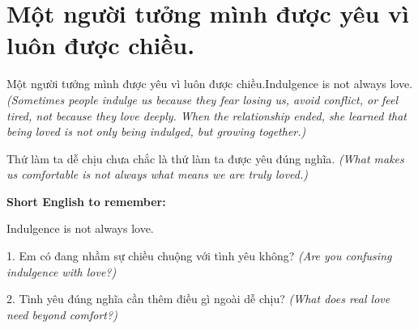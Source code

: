 \section{Một người tưởng mình được yêu vì luôn được chiều.}
\begin{truyen}{Một người tưởng mình được yêu vì luôn được chiều.}{Indulgence is not always love.}
\textit{(Sometimes people indulge us because they fear losing us, avoid conflict, or feel tired, not because they love deeply. When the relationship ended, she learned that being loved is not only being indulged, but growing together.)}
\end{truyen}
\begin{baihoc}
Thứ làm ta dễ chịu chưa chắc là thứ làm ta được yêu đúng nghĩa.
\textit{(What makes us comfortable is not always what means we are truly loved.)}
\end{baihoc}
\begin{ghinhoanh}
\textbf{Short English to remember:}

Indulgence is not always love.
\end{ghinhoanh}
\begin{tuhocnhanh}
1. Em có đang nhầm sự chiều chuộng với tình yêu không? \textit{(Are you confusing indulgence with love?)}

2. Tình yêu đúng nghĩa cần thêm điều gì ngoài dễ chịu? \textit{(What does real love need beyond comfort?)}
\end{tuhocnhanh}
\ngancach

